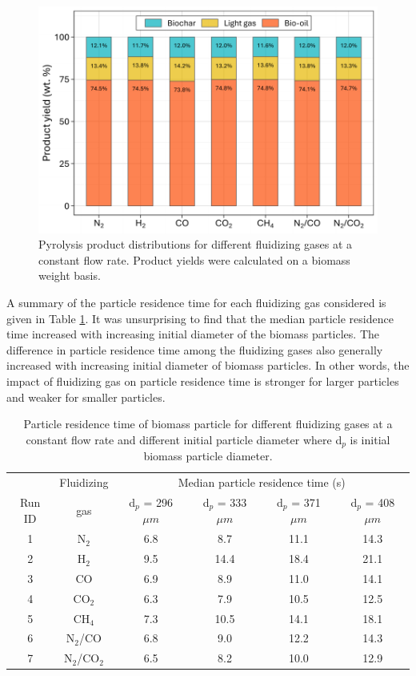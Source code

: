 \documentclass{article}
\begin{document}
\begin{figure}[H]
    \centering
    \includegraphics[width=1.0\textwidth]{figures/cfd-product-yield.pdf}
    \caption{Pyrolysis product distributions for different fluidizing gases at a constant flow rate. Product yields were calculated on a biomass weight basis.}
    \label{fig:cfd-product-yield}
\end{figure}

A summary of the particle residence time for each fluidizing gas considered is given in Table \ref{tab:particle-restime}. It was unsurprising to find that the median particle residence time increased with increasing initial diameter of the biomass particles. The difference in particle residence time among the fluidizing gases also generally increased with increasing initial diameter of biomass particles. In other words, the impact of fluidizing gas on particle residence time is stronger for larger particles and weaker for smaller particles.

\begin{table}[H]
    \centering
    \caption{Particle residence time of biomass particle for different fluidizing gases at a constant flow rate and different initial particle diameter where d$_p$ is initial biomass particle diameter.}
    \label{tab:particle-restime}
    \begin{tabular}{cccccc}
        \toprule
               & Fluidizing & \multicolumn{4}{c}{Median particle residence time (s)} \\
        Run ID & gas        & d$_p$ = 296 $\mu m$ & d$_p$ = 333 $\mu m$ & d$_p$ = 371 $\mu m$ & d$_p$ = 408 $\mu m$ \\
        \midrule
        1 & N$_2$        & 6.8 & 8.7  & 11.1  & 14.3 \\
        2 & H$_2$        & 9.5 & 14.4 & 18.4 & 21.1 \\
        3 & CO           & 6.9 & 8.9  & 11.0  & 14.1 \\
        4 & CO$_2$       & 6.3 & 7.9  & 10.5  & 12.5 \\
        5 & CH$_4$       & 7.3 & 10.5  & 14.1 & 18.1 \\
        6 & N$_2$/CO     & 6.8 & 9.0  & 12.2  & 14.3 \\
        7 & N$_2$/CO$_2$ & 6.5 & 8.2  & 10.0  & 12.9 \\
        \bottomrule
    \end{tabular}
\end{table}
\end{document}
